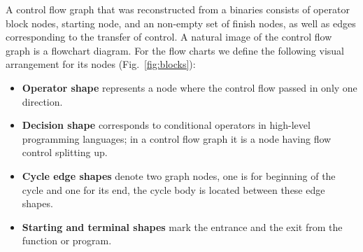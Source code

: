 \documentclass[conference]{IEEEtran}
\begin{document}
A control flow graph that was reconstructed from a binaries consists of operator block nodes, starting node, and an non-empty set of finish nodes, as well as edges corresponding to the transfer of control.  A natural image of the control flow graph is a flowchart diagram.  For the flow charts we define the following visual arrangement for its nodes (Fig.~\ref{fig:blocks}):
\begin{itemize}
\item \textbf{Operator shape} represents a node where the control flow passed in only one direction.
\item \textbf{Decision shape} corresponds to conditional operators in high-level programming languages; in a control flow graph it is a node having flow control splitting up.
\item \textbf{Cycle edge shapes} denote two graph nodes, one is for beginning of the cycle and one for its end, the cycle body is located between these edge shapes.
\item \textbf{Starting and terminal shapes} mark the entrance and the exit from the function or program.
\end{itemize}
\end{document}
